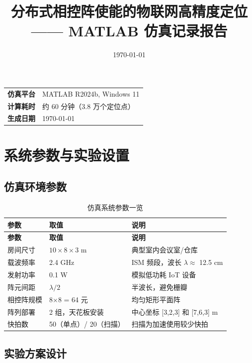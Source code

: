 \documentclass[12pt,a4paper]{ctexart}
\title{\textbf{分布式相控阵使能的物联网高精度定位\\—— MATLAB 仿真记录报告}}
\author{}
\date{\today}
\begin{document}
\maketitle

\begin{center}
\vspace{1cm}
\begin{tabular}{rl}
\toprule
\textbf{仿真平台} & MATLAB R2024b, Windows 11 \\
\textbf{计算耗时} & 约 60 分钟（3.8 万个定位点） \\
\textbf{生成日期} & \today \\
\bottomrule
\end{tabular}
\end{center}

\vspace{1cm}

\section{系统参数与实验设置}

\subsection{仿真环境参数}

\begin{longtable}{lll}
\caption{仿真系统参数一览}\\
\toprule
\textbf{参数} & \textbf{取值} & \textbf{说明} \\
\midrule
\endfirsthead
\toprule
\textbf{参数} & \textbf{取值} & \textbf{说明} \\
\midrule
\endhead
\bottomrule
\endfoot
房间尺寸   & $10 \times 8 \times 3$ m & 典型室内会议室/仓库 \\
载波频率   & 2.4 GHz                  & ISM 频段，波长 $\lambda \approx$ 12.5 cm \\
发射功率   & 0.1 W                    & 模拟低功耗 IoT 设备 \\
阵元间距   & $\lambda/2$              & 半波长，避免栅瓣 \\
相控阵规模 & 8$\times$8 = 64 元       & 均匀矩形平面阵 \\
阵列部署   & 2 组，天花板安装          & 中心坐标 [3,2,3] 和 [7,6,3] m \\
快拍数     & 50（单点）/ 20（扫描）   & 扫描为加速使用较少快拍 \\
\bottomrule
\end{longtable}

\subsection{实验方案设计}
\end{document}
